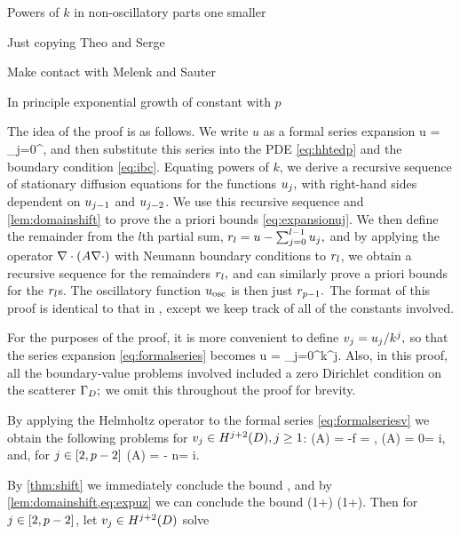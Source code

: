 \enth

\bit
\item Powers of $k$ in non-oscillatory parts one smaller
\item Just copying Theo and Serge
\item Make contact with Melenk and Sauter
\item In principle exponential growth of constant with $p$
\eit

The idea of the proof is as follows. We write $u$ as a formal series expansion
\beq\label{eq:formalseries}
u = \sum_{j=0}^\infty \usj,
\eeq
and then substitute this series into the PDE \cref{eq:hhtedp} and the boundary condition \eqref{eq:ibc}. Equating powers of $k$, we derive a recursive sequence of stationary diffusion equations for the functions $u_{j},$ with right-hand sides dependent on $u_{j-1}$ and $u_{j-2}$. We use this recursive sequence and \cref{lem:domainshift} to prove the a priori bounds \cref{eq:expansionuj}. We then define the remainder from the $l$th partial sum, $r_{l} = u - \sum_{j=0}^{l-1} u_{j},$ and by applying the operator $\grad\cdot\mleft(A\grad \cdot\mright)$ with Neumann boundary conditions to $r_{l}$, we obtain a recursive sequence for the remainders $r_{l},$ and can similarly prove a priori bounds for the $r_{l}$s. The oscillatory function $u_{\mathrm{osc}}$ is then just $r_{p-1}.$ The format of this proof is identical to that in \cite[Theorem 1]{ChNi:18a}, except we keep track of all of the constants involved.

For the purposes of the proof, it is more convenient to define $v_{j} = u_{j}/k^j,$ so that the series expansion \cref{eq:formalseries} becomes
\beq\label{eq:formalseriesv}
u = \sum_{j=0}^\infty k^j\vj.
\eeq
Also, in this proof, all the boundary-value problems involved included a zero Dirichlet condition on the scatterer $\Gamma_{D};$ we omit this throughout the proof for brevity.

By applying the Helmholtz operator to the formal series \eqref{eq:formalseriesv} we obtain the following problems for $\vj \in \HjptD, j \geq 1$:
\beqs
\grad \cdot \mleft(A\grad \vz\mright) = -f \quad\tand\quad \dn \vz = \gI,
\eeqs
\beqs
\grad \cdot \mleft(A\grad \vo\mright) = 0\quad\tand\quad\dn \vo = i\vz,
\eeqs
and, for $j \in \mleft[2,p-2\mright]$
\beqs
\grad \cdot \mleft(A\grad \vj\mright) = - n\vjmt\quad\tand\quad\dn \vz = i\vjmo.
\eeqs

By \cref{thm:shift} we immediately conclude the bound
\beq\label{eq:expuz}
\NHtD{\vz} \leq \CAz\Cfg,
\eeq
and by \cref{lem:domainshift,eq:expuz} we can conclude the bound
\beqs
\NHthD{\vo} \leq \CAo \mleft(1+\CTrt\mright) \leq \CAz \CAo \mleft(1+\CTrt\mright)\Cfg.
\eeqs
Then for $j \in \mleft[2,p-2\mright]$, let $\vj \in \HjptD$ solve

